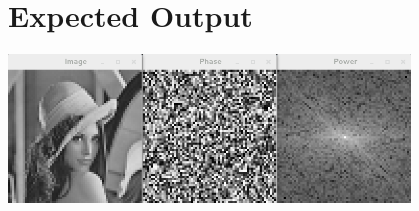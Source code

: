 \documentclass[12pt]{article}
\begin{document}
\section*{Expected Output}

\begin{center}
\includegraphics[width=0.8\textwidth]{result_images.png}
\end{center}
\end{document}
